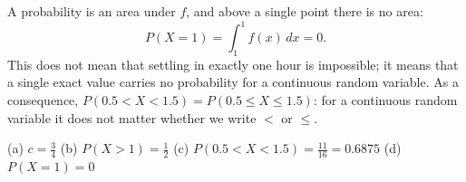 \begin{solution}
	 A probability is an area under $f$, and above a single point
	there is no area:
	\[ P(X=1)=\int_1^1 f(x)\,dx=0. \]
	This does not mean that settling in exactly one hour is impossible; it
	means that a single exact value carries no probability for a continuous
	random variable. As a consequence, $P(0.5<X<1.5)=P(0.5\le X\le1.5)$: for a
	continuous random variable it does not matter whether we write $<$ or
	$\le$.
	\begin{answer}
		(a) $c=\frac34$ \quad (b) $P(X>1)=\frac12$ \quad
		(c) $P(0.5<X<1.5)=\frac{11}{16}=0.6875$ \quad (d) $P(X=1)=0$
	\end{answer}
\end{solution}

